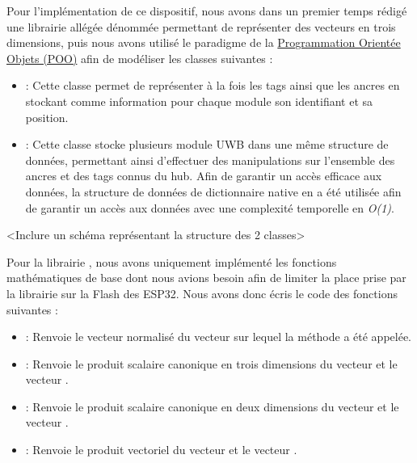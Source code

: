 Pour l'implémentation de ce dispositif, nous avons dans un premier temps rédigé une librairie allégée dénommée {} permettant de représenter des vecteurs en trois dimensions, puis nous avons utilisé le paradigme de la \uline{Programmation Orientée Objets (POO)} afin de modéliser les classes suivantes :

\begin{itemize}
    \item {} : Cette classe permet de représenter à la fois les tags ainsi que les ancres en stockant comme information pour chaque module son identifiant et sa position.
    \item {} : Cette classe stocke plusieurs module UWB dans une même structure de données, permettant ainsi d'effectuer des manipulations sur l'ensemble des ancres et des tags connus du hub. Afin de garantir un accès efficace aux données, la structure de données de dictionnaire native en {} a été utilisée afin de garantir un accès aux données avec une complexité temporelle en {\emph{O(1)}}.
\end{itemize}
\bigskip
<Inclure un schéma représentant la structure des 2 classes>
\bigskip

Pour la librairie {}, nous avons uniquement implémenté les fonctions mathématiques de base dont nous avions besoin afin de limiter la place prise par la librairie sur la Flash des ESP32. Nous avons donc écris le code des fonctions suivantes :

\begin{itemize}
    \item {} : Renvoie le vecteur normalisé du vecteur sur lequel la méthode a été appelée.
    \item {} : Renvoie le produit scalaire canonique en trois dimensions du vecteur {} et le vecteur {}.
    \item {} : Renvoie le produit scalaire canonique en deux dimensions du vecteur {} et le vecteur {}.
    \item {} : Renvoie le produit vectoriel du vecteur {} et le vecteur {}. 
\end{itemize}

